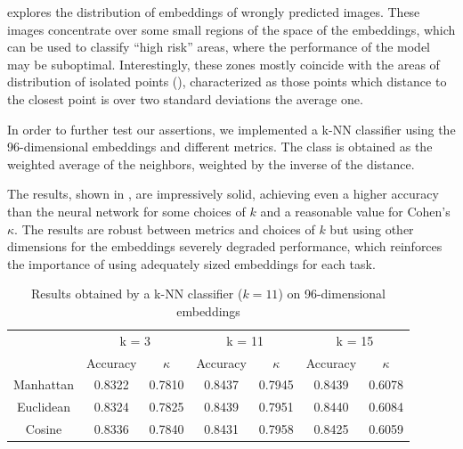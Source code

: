  explores the distribution of embeddings of wrongly predicted images. These images concentrate over some small regions of the space of the embeddings, which can be used to classify ``high risk'' areas, where the performance of the model may be suboptimal. Interestingly, these zones mostly coincide with the areas of distribution of isolated points (), characterized as those points which distance to the closest point is over two standard deviations the average one. 

In order to further test our assertions, we implemented a k-NN classifier using the 96-dimensional embeddings and different metrics. The class is obtained as the weighted average of the neighbors, weighted by the inverse of the distance. 

The results, shown in , are impressively solid, achieving even a higher accuracy than the neural network for some choices of \( k \) and a reasonable value for Cohen's \( \kappa \). The results are robust between metrics and choices of \( k \) but using other dimensions for the embeddings severely degraded performance, which reinforces the importance of using adequately sized embeddings for each task. 

\begin{table}[tb]
    \centering
    \small
    \begin{tabular}{c|cccccc|}
    \cline{2-7}
        & \multicolumn{2}{c|}{k = 3} & \multicolumn{2}{c|}{k = 11} & \multicolumn{2}{c|}{k = 15} \\ \cline{2-7} 
        & Accuracy & \multicolumn{1}{c|}{$\kappa$} & Accuracy & \multicolumn{1}{c|}{$\kappa$} & Accuracy & \multicolumn{1}{c|}{$\kappa$} \\ \hline \hline
    \multicolumn{1}{|c|}{Manhattan} & 0.8322 & \multicolumn{1}{c|}{0.7810} & 0.8437 & \multicolumn{1}{c|}{0.7945} & 0.8439 & 0.6078 \\ \hline
    \multicolumn{1}{|c|}{Euclidean} & 0.8324 & \multicolumn{1}{c|}{0.7825} & 0.8439 & \multicolumn{1}{c|}{0.7951} & 0.8440 & 0.6084 \\ \hline
    \multicolumn{1}{|c|}{Cosine} & 0.8336 & \multicolumn{1}{c|}{0.7840} & 0.8431 & \multicolumn{1}{c|}{0.7958} & 0.8425 & 0.6059 \\ \hline
    \end{tabular}
    \caption{Results obtained by a k-NN classifier ($k = 11$) on 96-dimensional embeddings}
\label{table:knn}
\end{table}

